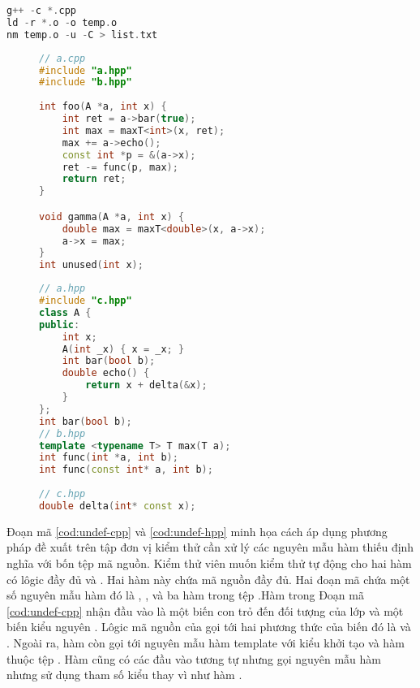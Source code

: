 \begin{lstlisting}[language=C++, caption={Các câu lệnh tìm nguyên mẫu hàm thiếu định nghĩa cần quan tâm sử dụng trình biên dịch.}, label={cod:command-undef},  captionpos=b]
g++ -c *.cpp
ld -r *.o -o temp.o
nm temp.o -u -C > list.txt
\end{lstlisting}

\begin{figure}[t]
    \begin{minipage}[t]{0.49\linewidth}
    \begin{lstlisting}[language=C++, caption={Mã nguồn tệp a.cpp.}, label={cod:undef-cpp}, captionpos=b]
// a.cpp
#include "a.hpp"
#include "b.hpp"
    
int foo(A *a, int x) {
    int ret = a->bar(true);
    int max = maxT<int>(x, ret);
    max += a->echo();
    const int *p = &(a->x);
    ret -= func(p, max);
    return ret;
}

void gamma(A *a, int x) {
    double max = maxT<double>(x, a->x);
    a->x = max;
}
int unused(int x);
    \end{lstlisting}
    \end{minipage}
    \begin{minipage}[t]{0.49\linewidth}
    \begin{lstlisting}[language=C++, caption={Mã nguồn tệp a.hpp, b.hpp và c.hpp.}, label={cod:undef-hpp}, captionpos=b]
// a.hpp
#include "c.hpp"
class A {
public: 
    int x;
    A(int _x) { x = _x; }
    int bar(bool b);
    double echo() {
        return x + delta(&x);
    }
};
int bar(bool b);
// b.hpp
template <typename T> T max(T a);
int func(int *a, int b);
int func(const int* a, int b);
    
// c.hpp
double delta(int* const x);  
    \end{lstlisting}
\end{minipage}
\end{figure}

Đoạn mã \ref{cod:undef-cpp} và \ref{cod:undef-hpp} minh họa cách áp dụng phương pháp đề xuất trên tập đơn vị kiểm thử cần xử lý các nguyên mẫu hàm thiếu định nghĩa với bốn tệp mã nguồn. Kiểm thử viên muốn kiểm thử tự động cho hai hàm có lôgic đầy đủ  và . Hai hàm này chứa mã nguồn đầy đủ. Hai đoạn mã chứa một số nguyên mẫu hàm đó là , ,  và ba hàm trong tệp .Hàm  trong Đoạn mã \ref{cod:undef-cpp} nhận đầu vào là một biến con trỏ đến đối tượng của lớp  và một biến kiểu nguyên . Lôgic mã nguồn của  gọi tới hai phương thức của biến  đó là  và . Ngoài ra, hàm  còn gọi tới nguyên mẫu hàm template  với kiểu khởi tạo  và hàm  thuộc tệp . Hàm  cũng có các đầu vào tương tự nhưng gọi nguyên mẫu hàm  nhưng sử dụng tham số kiểu  thay vì  như hàm .

